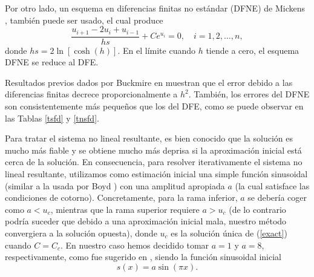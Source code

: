 Por otro lado, un esquema en diferencias finitas no estándar (DFNE) de Mickens \cite{buckmire}, también puede ser usado, el cual produce
\begin{equation}\label{nsfd}
\frac{u_{i+1}-2u_i+u_{i-1}}{hs}+Ce^{u_i}=0, \quad i=1,2, \ldots,n,
\end{equation}
donde $hs=2\ln{[\cosh{(h)}]}$. En el límite cuando $h$ tiende a cero, el esquema DFNE se reduce al DFE.

Resultados previos dados por Buckmire en \cite{buckmire} muestran que el error debido a las diferencias finitas decrece proporcionalmente a $h^2$.
También, los errores del DFNE son consistentemente más pequeños que los del DFE, como se puede observar en las Tablas \ref{tsfd} y \ref{tnsfd}.

Para tratar el sistema no lineal resultante, es bien conocido que la solución es mucho más fiable y se obtiene mucho más deprisa si la aproximación inicial está cerca de la solución. En consecuencia, para resolver iterativamente el sistema no lineal resultante, utilizamos como estimación inicial una simple función sinusoidal (similar a la usada por Boyd \cite{boyd}) con una amplitud apropiada $a$ (la cual satisface las condiciones de cotorno). Concretamente, para la rama inferior, $a$ se debería coger como $a < u_c$, mientras que la rama superior requiere $a>u_c$ (de lo contrario podría suceder que debido a una aproximación inicial mala, nuestro método convergiera a la solución opuesta), donde $u_c$ es la solución única de (\ref{exact}) cuando $C=C_c$. En nuestro caso hemos decidido tomar $a=1$ y $a=8$, respectivamente, como fue sugerido en \cite{mohsen}, siendo la función sinusoidal inicial
\begin{equation}
s(x)=a \sin(\pi x).
\end{equation}

